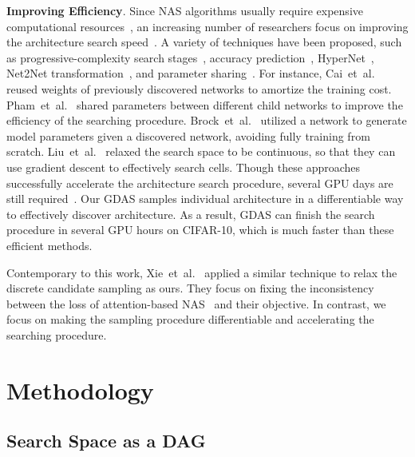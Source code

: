 \documentclass[10pt,twocolumn,letterpaper]{article}
\begin{document}
\textbf{Improving Efficiency}.
Since NAS algorithms usually require expensive computational resources~\cite{zoph2017NAS,Zoph_2018_CVPR,real2019regularized}, an increasing number of researchers focus on improving the architecture search speed~\cite{cai2018efficient,Liu_2018_ECCV,pmlr-v80-pham18a,Véniat_2018_CVPR,liu2019darts}.
A variety of techniques have been proposed, such as progressive-complexity search stages~\cite{Liu_2018_ECCV}, accuracy prediction~\cite{baker2018accelerating}, HyperNet~\cite{brock2018smash}, Net2Net transformation~\cite{cai2018efficient}, and parameter sharing~\cite{pmlr-v80-pham18a}.
For instance, Cai~et~al.~\cite{cai2018efficient} reused weights of previously discovered networks to amortize the training cost.
Pham~et~al.~\cite{pmlr-v80-pham18a} shared parameters between different child networks to improve the efficiency of the searching procedure.
Brock~et~al.~\cite{brock2018smash} utilized a network to generate model parameters given a discovered network, avoiding fully training from scratch.
Liu~et~al.~\cite{liu2019darts} relaxed the search space to be continuous, so that they can use gradient descent to effectively search cells.
Though these approaches successfully accelerate the architecture search procedure, several GPU days are still required~\cite{Liu_2018_ECCV,cai2018efficient}.
Our GDAS samples individual architecture in a differentiable way to effectively discover architecture. As a result, GDAS can finish the search procedure in several GPU hours on CIFAR-10, which is much faster than these efficient methods.

Contemporary to this work, Xie~et~al.~\cite{xie2018snas} applied a similar technique to relax the discrete candidate sampling as ours. They focus on fixing the inconsistency between the loss of attention-based NAS~\cite{liu2019darts} and their objective. In contrast, we focus on making the sampling procedure differentiable and accelerating the searching procedure.









\section{Methodology}



\subsection{Search Space as a DAG}\label{sec:method-space}
\end{document}
